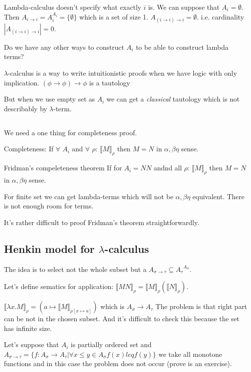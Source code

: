 \documentclass[a4paper,10pt]{book}
\newcommand{\sem}[2]{ \llbracket#1\rrbracket_{#2} }
\begin{document}
Lambda-calculus doesn't specify what exactly $i$ is. We can suppose that $A_i=\emptyset$. Then
$A_{i\rightarrow i} = A_i^{A_i} = \{ \emptyset \}$ which is a set of size 1. $A_{(i\rightarrow i)\rightarrow i} = { \emptyset }$. i.e. cardinality $|A_{(i\rightarrow i)\rightarrow i} | = 0 $.

Do we have any other ways to construct $A_i$ to be able to construct lambda terms?

$\lambda$-calculus is a way to write intuitionistic proofs when we have logic with only implication. 
 $(\phi \rightarrow \phi)\rightarrow \phi$ is a tautology

But when we use empty set as $A_i$ we can get a \textit{classical} tautology which is not describably by $\lambda$-term.

\subsection{}
We need a one thing for completeness proof.

Completeness: If $\forall$ $A_i$ and $\forall$ $\rho$: $\sem{M}{\rho}$ then $M=N$ in 
$\alpha,\beta\eta$ sense.

Fridman's compeleteness theorem
If for $A_i=NN$ andnd all $\rho$: $\sem{M}{\rho}$ then $M=N$ in 
$\alpha,\beta\eta$ sense.

For finite set we can get lambda-terms which will not be $\alpha,\beta\eta$ equivalent. There is not enough room for terms.

It's rather difficult to proof Fridman's theorem straightforwardly.

\subsection{Henkin model for $\lambda$-calculus}
The idea is to select not the whole subset but a $A_{\sigma \rightarrow \tau} \subseteq {A_\tau}^{A_\sigma}$.

Let's define sematics for application:
$\sem{MN}{\rho} = \sem{M}{\rho}(\sem{N}{\rho})$.

$\sem{\lambda x . M}{\rho} = (a \mapsto \sem{M}{\rho[x \mapsto a]})$ which is $A_\sigma \rightarrow A_\tau$
The problem is that right part can be not in the chosen subset. And it's difficult to check this because the 
set has infinite size.

Let's suppose that $A_i$ is partially ordered set and
$A_{\sigma \rightarrow \tau} = \{ f: A_\sigma \rightarrow A_\tau | 
\forall x \leq y \in A_\sigma f(x) leq f(y)\}$
we take all monotone functions and in this case the problem does not occur (prove is an exercise).
\end{document}
